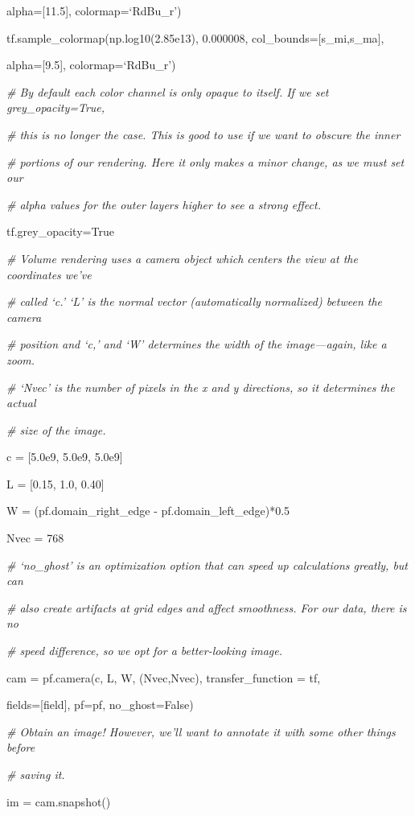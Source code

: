 {\setlength{\parindent}{96pt}alpha=[11.5], colormap=`RdBu\_r')}

tf.sample\_colormap(np.log10(2.85e13), 0.000008, col\_bounds=[s\_mi,s\_ma],

{\setlength{\parindent}{96pt}alpha=[9.5], colormap=`RdBu\_r')}

{\it\# By default each color channel is only opaque to itself. If  we set grey\_opacity=True,}
{\setlength{\parskip}{0pt}

{\it\# this is no longer the case. This is good to use if we want to obscure the inner}

{\it\# portions of our rendering. Here it only makes a minor change, as we must set our}

{\it\# alpha values for the outer layers higher to see a strong effect.}

tf.grey\_opacity=True
}

{\it\# Volume rendering uses a camera object which centers the view at the coordinates we've}
{\setlength{\parskip}{0pt}

{\it\# called `c.' `L' is the normal vector (automatically normalized) between the camera}

{\it\# position and `c,' and `W' determines the width of the image---again, like a zoom.}

{\it\# `Nvec' is the number of pixels in the x and y directions, so it determines the actual} 

{\it\# size of the image.}

c = [5.0e9, 5.0e9, 5.0e9]
}

L = [0.15, 1.0, 0.40]

W = (pf.domain\_right\_edge - pf.domain\_left\_edge)*0.5

Nvec = 768

{\it\# `no\_ghost' is an optimization option that can speed up calculations greatly, but can}
{\setlength{\parskip}{0pt}

{\it\# also create artifacts at grid edges and affect smoothness.  For our data, there is no}

{\it\# speed difference, so we opt for a better-looking image.}

cam = pf.camera(c, L, W, (Nvec,Nvec), transfer\_function = tf,
}

{\setlength{\parindent}{95pt}fields=[field], pf=pf, no\_ghost=False)}

{\it\# Obtain an image! However, we'll want to annotate it with some other things before}
{\setlength{\parskip}{0pt}

{\it\# saving it.}

im = cam.snapshot()
}

